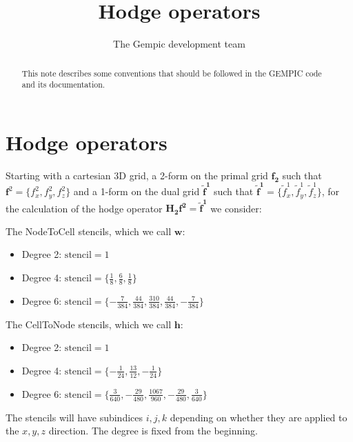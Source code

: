 \documentclass[11pt]{article}
\title{Hodge operators}
\author[1]{The Gempic development team}
\affil[1]{Max-Planck-Institut f\"ur Plasmaphysik, Garching, Germany}
\begin{document}
\maketitle

\begin{abstract}
This note describes some conventions that should be followed in the GEMPIC code
and its documentation.
\end{abstract}

\tableofcontents

\section{Hodge operators}
Starting with a cartesian 3D grid, a 2-form on the primal grid $\mathbf{f_2}$ such that $ \mathbf{f}^2 = \{ f_{x}^2, f_{y}^2, f_{z}^2 \}$ and a 1-form on the dual grid $\mathbf{\tilde f^1}$ such that $ \mathbf{\tilde f^1} = \{ \tilde f_{x}^1, \tilde f_{y}^1, \tilde f_{z}^1 \}$, for the calculation of the hodge operator $\mathbf{H_2}\mathbf{f^2} = \mathbf{\tilde f^1}$ we consider:
\linebreak

The NodeToCell stencils, which we call $\mathbf{w}$: 

\begin{itemize}
    \item Degree 2: $\text{stencil} = 1$
    \item Degree 4: $\text{stencil} = \{ \frac{1}{8}, \frac{6}{8}, \frac{1}{8} \}$ 
    \item Degree 6: $\text{stencil} = \{ -\frac{7}{384}, \frac{44}{384}, \frac{310}{384}, \frac{44}{384}, -\frac{7}{384} \}$ 
\end{itemize}

The CellToNode stencils, which we call $\mathbf{h}$: 

\begin{itemize}
    \item Degree 2: $\text{stencil} = 1$
    \item Degree 4: $\text{stencil} = \{ -\frac{1}{24}, \frac{13}{12}, -\frac{1}{24} \}$ 
    \item Degree 6: $\text{stencil} = \{ \frac{3}{640}, -\frac{29}{480}, \frac{1067}{960}, -\frac{29}{480}, \frac{3}{640} \}$ 
\end{itemize}

The stencils will have subindices $i,j,k$ depending on whether they are applied to the $x, y, z$ direction. The degree is fixed from the beginning.
\linebreak
\end{document}
